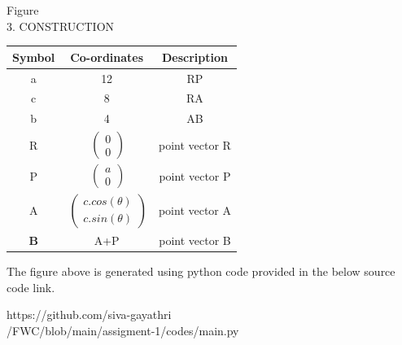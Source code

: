 \documentclass[a4paper,10pt]{report}
\begin{document}
\begin{multicols}{2}
\centering\normalsize{Figure}\vspace{5mm}\\


\centering \large\textsc{3.  C}\footnotesize\textsc{ONSTRUCTION}\vspace{5mm}\\
\begin{center}
    \label{tab:truthtable}
    \setlength{\arrayrulewidth}{0.2mm}
\setlength{\tabcolsep}{5pt}
\renewcommand{\arraystretch}{2}
    \begin{tabular}{|c|c|c|}
    \hline %
      \large\textbf{Symbol} & \large\textbf{Co-ordinates} & \large\textbf{Description}\\
      \hline
	\large a & 12 & \large RP\\
	\large c & 8 & \large RA\\
	\large b & 4 & \large AB\\
	\large R &  $\ \begin{pmatrix} 0\\0 \end{pmatrix}$  & \large point vector R\\
	\large P &  $\ \begin{pmatrix} a\\0 \end{pmatrix}$ & \large point vector P\\
	\large A &  $\ \begin{pmatrix} c.cos(\theta) \\ c. sin(\theta) \end{pmatrix}$ & \large point vector A\\ 
		\large\textbf B & {A+P}  & \large point vector B\\ 
      \hline 
   \end{tabular}
 \end{center}\vspace{10mm} 


\raggedright\large{The figure above is generated using python code provided in the below source code link.}\vspace{2mm}\\
\begin{mdframed}
\raggedright\large{https://github.com/siva-gayathri \\ /FWC/blob/main/assigment-1/codes/main.py}
\end{mdframed}


\end{multicols}
\end{document}
